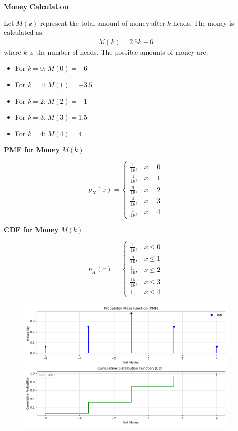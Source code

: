 \documentclass[journal]{IEEEtran}
\numberwithin{equation}{enumi}
\numberwithin{figure}{enumi}
\begin{document}
\textbf{Money Calculation}

Let \( M(k) \) represent the total amount of money after \( k \) heads. The money is calculated as:
\begin{align}
M(k) = 2.5k - 6
\end{align}
where \( k \) is the number of heads. The possible amounts of money are:
\begin{itemize}
    \item For \( k = 0 \): \( M(0) = -6 \)
    \item For \( k = 1 \): \( M(1) = -3.5 \)
    \item For \( k = 2 \): \( M(2) = -1 \)
    \item For \( k = 3 \): \( M(3) = 1.5 \)
    \item For \( k = 4 \): \( M(4) = 4 \)
\end{itemize}
\textbf{PMF for Money \( M(k) \)}

\[
p_X(x) =
\begin{cases} 
\frac{1}{16}, & x = 0 \\ 
\frac{4}{16}, & x = 1 \\ 
\frac{6}{16}, & x = 2 \\ 
\frac{4}{16}, & x = 3 \\ 
\frac{1}{16}, & x = 4 
\end{cases}
\]


 \textbf{CDF for Money \( M(k) \)}

\[
p_X(x) =
\begin{cases} 
\frac{1}{16}, & x \leq 0 \\ 
\frac{5}{16}, & x \leq 1 \\ 
\frac{11}{16}, & x \leq 2 \\ 
\frac{15}{16}, & x \leq 3 \\ 
1, & x \leq 4 
\end{cases}
\]



\begin{figure}[h!]
   \centering
   \includegraphics[width=0.7\linewidth]{figs/Figure_1.png}
\end{figure}
\end{document}
